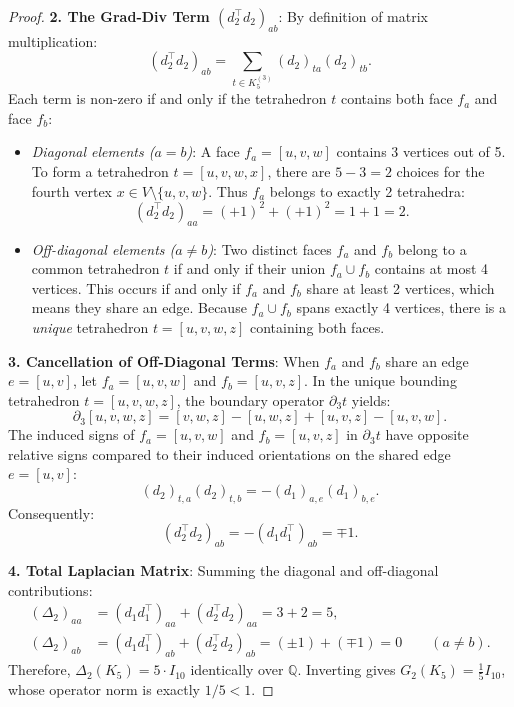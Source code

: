 \begin{proof}
\textbf{2. The Grad-Div Term $(d_2^\top d_2)_{ab}$}:
By definition of matrix multiplication:
\begin{equation}
(d_2^\top d_2)_{ab} = \sum_{t \in K_5^{(3)}} (d_2)_{ta} (d_2)_{tb}.
\end{equation}
Each term is non-zero if and only if the tetrahedron $t$ contains both face $f_a$ and face $f_b$:
\begin{itemize}
    \item \emph{Diagonal elements ($a = b$)}: A face $f_a = [u, v, w]$ contains 3 vertices out of 5. To form a tetrahedron $t = [u, v, w, x]$, there are $5 - 3 = 2$ choices for the fourth vertex $x \in V \setminus \{u, v, w\}$. Thus $f_a$ belongs to exactly 2 tetrahedra:
    \begin{equation}
    (d_2^\top d_2)_{aa} = (+1)^2 + (+1)^2 = 1 + 1 = 2.
    \end{equation}
    \item \emph{Off-diagonal elements ($a \neq b$)}: Two distinct faces $f_a$ and $f_b$ belong to a common tetrahedron $t$ if and only if their union $f_a \cup f_b$ contains at most 4 vertices. This occurs if and only if $f_a$ and $f_b$ share at least 2 vertices, which means they share an edge. Because $f_a \cup f_b$ spans exactly 4 vertices, there is a \emph{unique} tetrahedron $t = [u, v, w, z]$ containing both faces.
\end{itemize}

\textbf{3. Cancellation of Off-Diagonal Terms}:
When $f_a$ and $f_b$ share an edge $e = [u, v]$, let $f_a = [u, v, w]$ and $f_b = [u, v, z]$. In the unique bounding tetrahedron $t = [u, v, w, z]$, the boundary operator $\partial_3 t$ yields:
\begin{equation}
\partial_3 [u, v, w, z] = [v, w, z] - [u, w, z] + [u, v, z] - [u, v, w].
\end{equation}
The induced signs of $f_a = [u, v, w]$ and $f_b = [u, v, z]$ in $\partial_3 t$ have opposite relative signs compared to their induced orientations on the shared edge $e = [u, v]$:
\begin{equation}
(d_2)_{t, a} (d_2)_{t, b} = -(d_1)_{a, e} (d_1)_{b, e}.
\end{equation}
Consequently:
\begin{equation}
(d_2^\top d_2)_{ab} = -(d_1 d_1^\top)_{ab} = \mp 1.
\end{equation}

\textbf{4. Total Laplacian Matrix}:
Summing the diagonal and off-diagonal contributions:
\begin{align}
(\Delta_2)_{aa} &= (d_1 d_1^\top)_{aa} + (d_2^\top d_2)_{aa} = 3 + 2 = 5, \\
(\Delta_2)_{ab} &= (d_1 d_1^\top)_{ab} + (d_2^\top d_2)_{ab} = (\pm 1) + (\mp 1) = 0 \qquad (a \neq b).
\end{align}
Therefore, $\Delta_2(K_5) = 5 \cdot I_{10}$ identically over $\mathbb{Q}$. Inverting gives $G_2(K_5) = \frac{1}{5} I_{10}$, whose operator norm is exactly $1/5 < 1$.
\end{proof}

